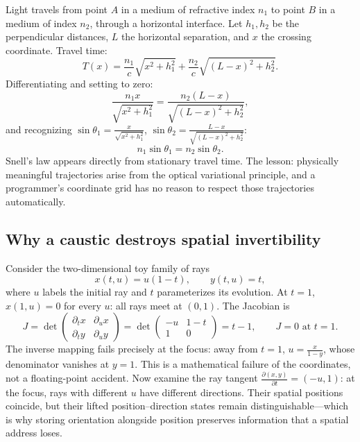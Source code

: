 \documentclass[11pt]{article}
\begin{document}
Light travels from point $A$ in a medium of refractive index $n_1$ to point $B$ in a
medium of index $n_2$, through a horizontal interface. Let $h_1,h_2$ be the perpendicular
distances, $L$ the horizontal separation, and $x$ the crossing coordinate. Travel time:
\begin{equation}
T(x) = \frac{n_1}{c}\sqrt{x^2+h_1^2} + \frac{n_2}{c}\sqrt{(L-x)^2+h_2^2}.
\end{equation}
Differentiating and setting to zero:
\begin{equation}
\frac{n_1 x}{\sqrt{x^2+h_1^2}} = \frac{n_2(L-x)}{\sqrt{(L-x)^2+h_2^2}},
\end{equation}
and recognizing $\sin\theta_1 = \frac{x}{\sqrt{x^2+h_1^2}}$,
$\sin\theta_2 = \frac{L-x}{\sqrt{(L-x)^2+h_2^2}}$:
\begin{equation}
\boxed{n_1 \sin\theta_1 = n_2 \sin\theta_2.}
\end{equation}
Snell's law appears directly from stationary travel time. The lesson: physically
meaningful trajectories arise from the optical variational principle, and a programmer's
coordinate grid has no reason to respect those trajectories automatically.

\subsection{Why a caustic destroys spatial invertibility}

Consider the two-dimensional toy family of rays
\begin{equation}
x(t,u) = u(1-t), \qquad y(t,u) = t,
\end{equation}
where $u$ labels the initial ray and $t$ parameterizes its evolution. At $t=1$,
$x(1,u)=0$ for every $u$: all rays meet at $(0,1)$. The Jacobian is
\begin{equation}
J = \det \begin{pmatrix} \partial_t x & \partial_u x \\ \partial_t y & \partial_u y \end{pmatrix}
= \det \begin{pmatrix} -u & 1-t \\ 1 & 0 \end{pmatrix} = t-1,
\qquad \boxed{J = 0 \text{ at } t=1.}
\end{equation}
The inverse mapping fails precisely at the focus: away from $t=1$,
$u = \frac{x}{1-y}$, whose denominator vanishes at $y=1$. This is a mathematical failure
of the coordinates, not a floating-point accident. Now examine the ray tangent
$\frac{\partial(x,y)}{\partial t} = (-u,1)$: at the focus, rays with different $u$ have
different directions. Their spatial positions coincide, but their lifted
position--direction states remain distinguishable---which is why storing orientation
alongside position preserves information that a spatial address loses.
\end{document}
